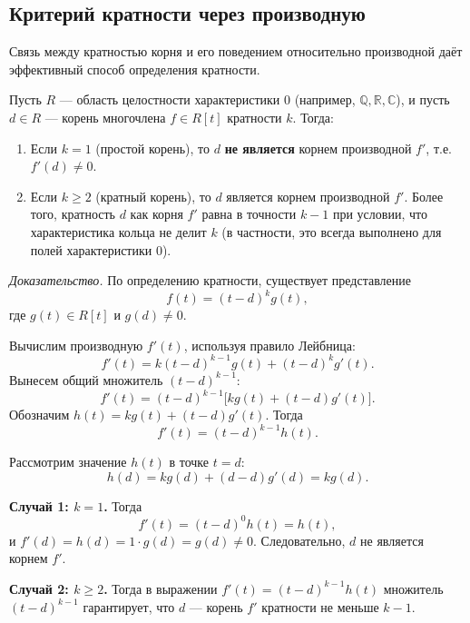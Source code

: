 \documentclass[a4paper,12pt]{article}
\theoremstyle{definition}
\theoremstyle{plain}
\theoremstyle{remark}
\begin{document}
	\subsection{Критерий кратности через производную}
	
	Связь между кратностью корня и его поведением относительно производной даёт эффективный способ определения кратности.
	
	\begin{tcolorbox}[colback=green!5, colframe=green!50!black, title=Теорема (Критерий кратного корня)]
		Пусть \( R \) — область целостности характеристики 0 (например, \( \mathbb{Q}, \mathbb{R}, \mathbb{C} \)), и пусть \( d \in R \) — корень многочлена \( f \in R[t] \) кратности \( k \). Тогда:
		
		\begin{enumerate}
			\item Если \( k = 1 \) (простой корень), то \( d \) \textbf{не является} корнем производной \( f' \), т.е. \( f'(d) \neq 0 \).
			\item Если \( k \geq 2 \) (кратный корень), то \( d \) является корнем производной \( f' \). Более того, кратность \( d \) как корня \( f' \) равна в точности \( k-1 \) при условии, что характеристика кольца не делит \( k \) (в частности, это всегда выполнено для полей характеристики 0).
		\end{enumerate}
	\end{tcolorbox}
	
	\medskip
	\textit{Доказательство.}
	По определению кратности, существует представление
	\[
	f(t) = (t - d)^k g(t),
	\]
	где \( g(t) \in R[t] \) и \( g(d) \neq 0 \).
	
	Вычислим производную \( f'(t) \), используя правило Лейбница:
	\[
	f'(t) = k(t - d)^{k-1} g(t) + (t - d)^k g'(t).
	\]
	Вынесем общий множитель \( (t - d)^{k-1} \):
	\[
	f'(t) = (t - d)^{k-1} \big[ k g(t) + (t - d) g'(t) \big].
	\]
	Обозначим \( h(t) = k g(t) + (t - d) g'(t) \). Тогда
	\[
	f'(t) = (t - d)^{k-1} h(t).
	\]
	
	Рассмотрим значение \( h(t) \) в точке \( t = d \):
	\[
	h(d) = k g(d) + (d - d) g'(d) = k g(d).
	\]
	
	\textbf{Случай 1: \( k = 1 \).} Тогда
	\[
	f'(t) = (t - d)^{0} h(t) = h(t),
	\]
	и \( f'(d) = h(d) = 1 \cdot g(d) = g(d) \neq 0 \). Следовательно, \( d \) не является корнем \( f' \).
	
	\textbf{Случай 2: \( k \geq 2 \).} Тогда в выражении \( f'(t) = (t - d)^{k-1} h(t) \) множитель \( (t - d)^{k-1} \) гарантирует, что \( d \) — корень \( f' \) кратности не меньше \( k-1 \).
	
\end{document}
